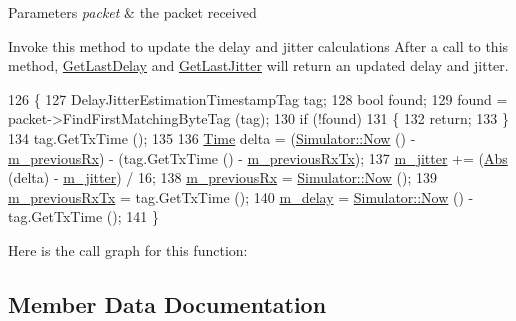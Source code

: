 \begin{DoxyParams}{Parameters}
{\em packet} & the packet received\\
\hline
\end{DoxyParams}
Invoke this method to update the delay and jitter calculations After a call to this method, \hyperlink{classns3_1_1DelayJitterEstimation_aa4af6dbec8f192a969499e5b82d28fa3}{Get\+Last\+Delay} and \hyperlink{classns3_1_1DelayJitterEstimation_a92d1f80a86286682a473ee76d9d9f06b}{Get\+Last\+Jitter} will return an updated delay and jitter. 
\begin{DoxyCode}
126 \{
127   DelayJitterEstimationTimestampTag tag;
128   \textcolor{keywordtype}{bool} found;
129   found = packet->FindFirstMatchingByteTag (tag);
130   \textcolor{keywordflow}{if} (!found)
131     \{
132       \textcolor{keywordflow}{return};
133     \}
134   tag.GetTxTime ();
135 
136   \hyperlink{namespacens3_1_1TracedValueCallback_a7ffd3e7c142ffe7c8a1d2db9b8de38ec}{Time} delta = (\hyperlink{classns3_1_1Simulator_ac3178fa975b419f7875e7105be122800}{Simulator::Now} () - \hyperlink{classns3_1_1DelayJitterEstimation_a19f18c143edbdd4c2939af12c686ee2c}{m\_previousRx}) - (tag.GetTxTime () - 
      \hyperlink{classns3_1_1DelayJitterEstimation_ae072ffd2955965756add116846e5d9e5}{m\_previousRxTx});
137   \hyperlink{classns3_1_1DelayJitterEstimation_a7bcede70a5da4cab9a0571e649c8e80a}{m\_jitter} += (\hyperlink{group__highprec_gabf87260a0ba68d152ae95568b2ef58fe}{Abs} (delta) - \hyperlink{classns3_1_1DelayJitterEstimation_a7bcede70a5da4cab9a0571e649c8e80a}{m\_jitter}) / 16;
138   \hyperlink{classns3_1_1DelayJitterEstimation_a19f18c143edbdd4c2939af12c686ee2c}{m\_previousRx} = \hyperlink{classns3_1_1Simulator_ac3178fa975b419f7875e7105be122800}{Simulator::Now} ();
139   \hyperlink{classns3_1_1DelayJitterEstimation_ae072ffd2955965756add116846e5d9e5}{m\_previousRxTx} = tag.GetTxTime ();
140   \hyperlink{classns3_1_1DelayJitterEstimation_accc7cfcabc4ec0f292ef70ef834448db}{m\_delay} = \hyperlink{classns3_1_1Simulator_ac3178fa975b419f7875e7105be122800}{Simulator::Now} () - tag.GetTxTime ();
141 \}
\end{DoxyCode}


Here is the call graph for this function\+:




\subsection{Member Data Documentation}
